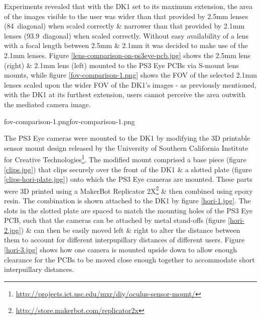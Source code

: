 Experiments revealed that with the DK1 set to its maximum extension, the area of the images visible to the user was wider than that provided by 2.5mm lenses (84\textdegree\ diagonal) when scaled correctly \& narrower than that provided by 2.1mm lenses (93.9\textdegree\ diagonal) when scaled correctly. Without easy availability of a lens with a focal length between 2.5mm \& 2.1mm it was decided to make use of the 2.1mm lenses. Figure \ref{lens-comparison-on-ps3eye-pcb.jpg} shows the 2.5mm lens (right) \& 2.1mm lens (left) mounted to the PS3 Eye PCBs via S-mount lens mounts, while figure \ref{fov-comparison-1.png} shows the FOV of the selected 2.1mm lenses scaled upon the wider FOV of the DK1's images - as previously mentioned, with the DK1 at its furthest extension, users cannot perceive the area outwith the mediated camera image.

       {fov-comparison-1.png}{}{fov-comparison-1.png}


The PS3 Eye cameras were mounted to the DK1 by modifying the 3D printable sensor mount design released by the University of Southern California Institute for Creative Technologies\footnote{\url{http://projects.ict.usc.edu/mxr/diy/oculus-sensor-mount/}}. The modified mount comprised a base piece (figure \ref{clips.jpg}) that clips securely over the front of the DK1 \& a slotted plate (figure \ref{clips-hori-plate.jpg}) onto which the PS3 Eye cameras are mounted. These parts were 3D printed using a MakerBot Replicator 2X\footnote{\url{http://store.makerbot.com/replicator2x}} \& then combined using epoxy resin. The combination is shown attached to the DK1 by figure \ref{hori-1.jpg}. The slots in the slotted plate are spaced to match the mounting holes of the PS3 Eye PCB, such that the cameras can be attached by metal stand-offs (figure \ref{hori-2.jpg}) \& can then be easily moved left \& right to alter the distance between them to account for different interpupillary distances of different users. Figure \ref{hori-3.jpg} shows how one camera is mounted upside down to allow enough clearance for the PCBs to be moved close enough together to accommodate short interpuillary distances.

